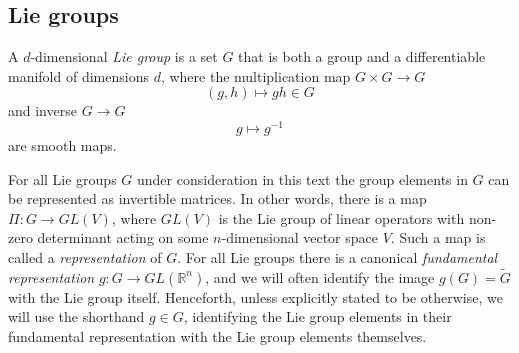 \subsection{Lie groups}

\begin{definition}
A $d$-dimensional \textit{Lie group} is a set $G$ that is both a group and a differentiable manifold of dimensions $d$, where the multiplication map $G\times G \to G$
\begin{equation}
(g,h) \mapsto gh \in G
\end{equation}
and inverse $G \to G$
\begin{equation}
g \mapsto g^{-1}
\end{equation}
are smooth maps.
\end{definition}

For all Lie groups $G$ under consideration in this text the group elements in $G$ can be represented as invertible matrices. In other words, there is a map $\Pi : G \to GL(V)$, where $GL(V)$ is the Lie group of linear operators with non-zero determinant acting on some $n$-dimensional vector space $V$. Such a map is called a \textit{representation} of $G$. For all Lie groups there is a canonical \textit{fundamental representation} $g : G \to GL(\mathbb{R}^{n})$, and we will often identify the image $g(G) = \tilde{G}$ with the Lie group itself. Henceforth, unless explicitly stated to be otherwise, we will use the shorthand $g \in G$, identifying the Lie group elements in their fundamental representation with the Lie group elements themselves.

